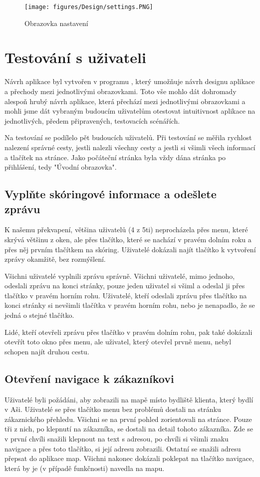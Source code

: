 \documentclass[11pt,twoside,a4paper]{book}
\begin{document}
\begin{figure}[H] 
	\centering
	\texttt{[image: figures/Design/settings.PNG]}
	\caption{Obrazovka nastavení}
	\label{fig:customerdetailscreens}
	\end{figure}


\section{Testování s uživateli}
Návrh aplikace byl vytvořen v programu , který umožňuje návrh designu aplikace a přechody mezi jednotlivými obrazovkami. Toto vše mohlo dát dohromady alespoň hrubý návrh aplikace, která přechází mezi jednotlivými obrazovkami a mohli jsme dát vybraným budoucím uživatelům otestovat intuitivnost aplikace na jednotlivých, předem připravených, testovacích scénářích. 

Na testování se podílelo pět budoucích uživatelů. Při testování se měřila rychlost nalezení správné cesty, jestli nalezli všechny cesty a jestli si všimli všech informací a tlačítek na stránce. Jako počáteční stránka byla vždy dána stránka po přihlášení, tedy "Úvodní obrazovka".

\subsection{Vyplňte skóringové informace a odešlete zprávu}
K našemu překvapení, většina uživatelů (4 z 5ti) neprocházela přes menu, které skrývá většinu z oken, ale přes tlačítko, které se nachází v pravém dolním roku a přes něj prvním tlačítkem na skóring. Uživatelé dokázali najít tlačítko k vytvoření zprávy okamžitě, bez rozmýšlení. 

Všichni uživatelé vyplnili zprávu správně. Všichni uživatelé, mimo jednoho, odeslali zprávu na konci stránky, pouze jeden uživatel si všiml a odeslal ji přes tlačítko v pravém horním rohu. Uživatelé, kteří odeslali zprávu přes tlačítko na konci stránky si nevšimli tlačítka v pravém horním rohu, nebo je nenapadlo, že se jedná o stejné tlačítko.

Lidé, kteří otevřeli zprávu přes tlačítko v pravém dolním rohu, pak také dokázali otevřít toto okno přes menu, ale uživatel, který otevřel prvně menu, nebyl schopen najít druhou cestu.

\subsection{Otevření navigace k zákazníkovi}
Uživatelé byli požádáni, aby zobrazili na mapě místo bydliště klienta, který bydlí v Aši. Uživatelé se přes tlačítko menu bez problémů dostali na stránku zákaznického přehledu. Všichni se na první pohled zorientovali na stránce. Pouze tři z nich, po klepnutí na zákazníka, se dostali na detail tohoto zákazníka. Zde se v první chvíli snažili klepnout na text s adresou, po chvíli si všimli znaku navigace a přes toto tlačítko, si její adresu zobrazili. Ostatní se snažili adresu přepsat do aplikace map. Všichni nakonec dokázali poklepat na tlačítko navigace, která by je (v případě funkčnosti) navedla na mapu.
\end{document}

